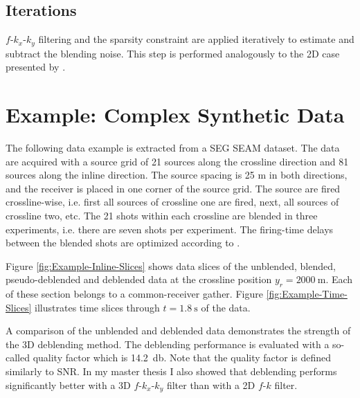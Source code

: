 \documentclass{madrid15WS}
\begin{document}
\subsection{Iterations}

$f$-$k_x$-$k_y$ filtering and the sparsity constraint are applied iteratively to estimate and subtract the blending noise. This step is performed analogously to the 2D case presented by \citet{Mahdad-Deblending-Method}.


\section{Example: Complex Synthetic Data}

The following data example is extracted from a SEG SEAM dataset. The data are acquired with a source grid of 21 sources along the crossline direction and 81 sources along the inline direction. The source spacing is 25 m in both directions, and the receiver is placed in one corner of the source grid. The source are fired crossline-wise, i.e. first all sources of crossline one are fired, next, all sources of crossline two, etc. The 21 shots within each crossline are blended in three experiments, i.e. there are seven shots per experiment. The firing-time delays between the blended shots are optimized according to \citet{myself}.

Figure \ref{fig:Example-Inline-Slices} shows data slices of the unblended, blended, pseudo-deblended and deblended data at the crossline position  $y_r = \SI{2000}{\metre}$. Each of these section belongs to a common-receiver gather. Figure \ref{fig:Example-Time-Slices} illustrates time slices through $t = \SI{1.8}{\second}$ of the data.

A comparison of the unblended and deblended data demonstrates the strength of the 3D deblending method. The deblending performance is evaluated with a so-called quality factor \citep{IbrahimQuality} which is \SI{14.2}{\decibel}. Note that the quality factor is defined similarly to SNR. In my master thesis \citep{myself} I also showed that deblending performs significantly better with a 3D $f$-$k_x$-$k_y$ filter than with a 2D $f$-$k$ filter.
\end{document}
